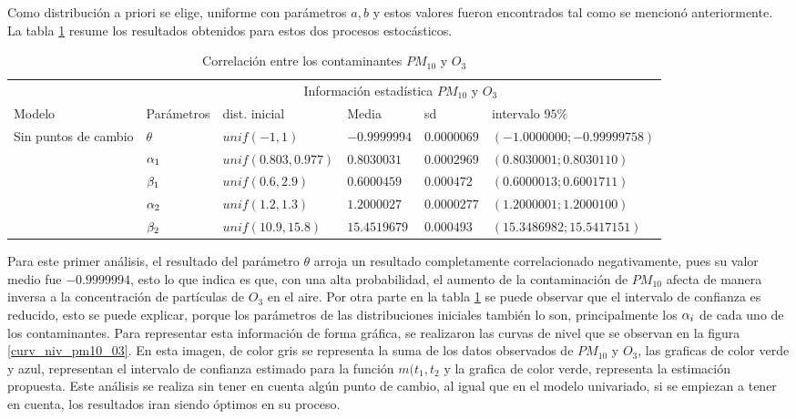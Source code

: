 Como distribución a priori se elige, uniforme con parámetros $a,b$ y estos valores fueron encontrados tal como se mencionó anteriormente. La tabla \ref{infoestad_PM10_Oz} resume los resultados obtenidos para estos dos procesos estocásticos. 
\begin{table}[!h]
\centering
\begin{tabular}{|l|l|l|l|l|l|}
\hline
& \multicolumn{5}{c|}{Información estadística $PM_{10}$ y $O_3$ } \\
\cline{2-6}
Modelo & Parámetros & dist. inicial  & Media & sd  &   intervalo $95 \%$\\
\hline \hline
\multirow{5}{1.5cm}{Sin puntos de cambio }  & $\theta$ & $unif(-1,1)$ & $-0.9999994$ & $0.0000069$ & $(-1.0000000;-0.99999758 )$ \\ \cline{2-6}
& $\alpha_1$& $unif(0.803,0.977)$ & $0.8030031$ & $0.0002969$ & $( 0.8030001;0.8030110)$\\  \cline{2-6}
& $\beta_1$& $unif(0.6,2.9)$ & $0.6000459$ & $0.000472$ & $(0.6000013;0.6001711)$\\  \cline{2-6}
& $\alpha_2$& $unif(1.2,1.3)$ & $1.2000027$ & $0.0000277$ & $(1.2000001;1.2000100)$\\  \cline{2-6}
& $\beta_2$& $unif(10.9,15.8)$ & $15.4519679$ & $0.000493$ & $(15.3486982;15.5417151)$\\  \cline{1-6}
\end{tabular}
\caption{Correlación entre los contaminantes $PM_{10}$ y $O_3$  }
\label{infoestad_PM10_Oz}
\end{table}

Para este primer análisis, el resultado del parámetro $\theta$ arroja un resultado completamente correlacionado negativamente, pues su valor medio fue $-0.9999994$, esto lo que indica es que, con una alta probabilidad, el aumento de la contaminación de $PM_{10}$ afecta de manera inversa a la concentración de partículas de $O_3$ en el aire. 
Por otra parte en la tabla \ref{infoestad_PM10_Oz} se puede observar que el intervalo de confianza es reducido, esto se puede explicar, porque los parámetros de las distribuciones iniciales también lo son, principalmente los $\alpha_i$ de cada uno de los contaminantes. Para representar esta información de forma gráfica, se realizaron las curvas de nivel que se observan en la figura \ref{curv_niv_pm10_03}. En esta imagen, de color gris se representa la suma de los datos observados de $PM_{10}$ y $O_3$, las graficas de color verde y azul, representan el intervalo de confianza estimado para la función $m(t_1,t_2$ y la grafica de color verde, representa la estimación propuesta. Este análisis se realiza sin tener en cuenta algún punto de cambio, al igual que en el modelo univariado, si se empiezan a tener en cuenta, los resultados iran siendo óptimos en su proceso.

